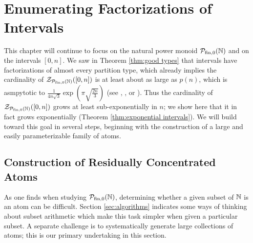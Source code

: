 \chapter{Enumerating Factorizations of Intervals}

This chapter will continue to focus on the natural power monoid ${\mathcal{P}_{\textrm{fin},0}(\mathbb{N})}$ and on the intervals $[0,n]$.
We saw in Theorem \ref{thm:good types} that intervals have factorizations of almost every partition type, which already implies the cardinality of $\mathcal{Z}_{\mathcal{P}_{\textrm{fin},0}(\mathbb{N})}([0,n])$ is at least about as large as $p(n)$, which is asmpytotic to $\frac{1}{4n\sqrt{3}} \exp\left(\pi\sqrt{\frac{2n}{3}}\right)$ (see \cite{hardy-ram18}, \cite{erdos42}, or \cite{nathanson02}).
Thus the cardinality of $\mathcal{Z}_{\mathcal{P}_{\textrm{fin},0}(\mathbb{N})}([0,n])$ grows at least sub-exponentially in $n$; we show here that it in fact grows exponentially (Theorem \ref{thm:exponential intervals}).
We will build toward this goal in several steps, beginning with the construction of a large and easily parameterizable family of atoms.


\section{Construction of Residually Concentrated Atoms}

As one finds when studying ${\mathcal{P}_{\textrm{fin},0}(\mathbb{N})}$, determining whether a given subset of $\mathbb{N}$ is an atom can be difficult.
Section \ref{sec:algorithms} indicates some ways of thinking about subset arithmetic which make this task simpler when given a particular subset.  
A separate challenge is to systematically generate large collections of atoms; this is our primary undertaking in this section.

